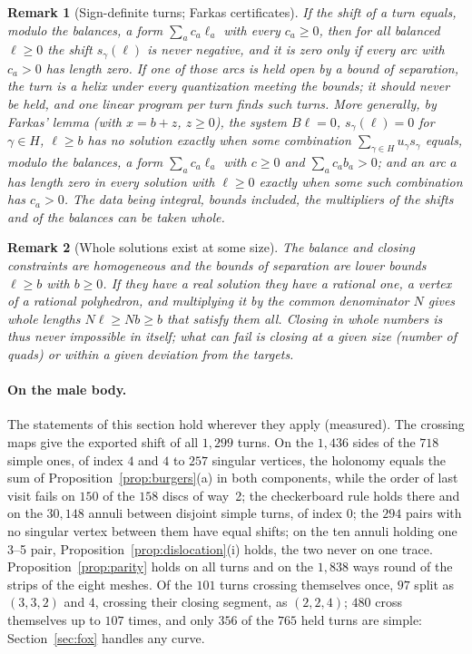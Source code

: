 \documentclass[11pt,a4paper]{article}
\newtheorem{remark}{Remark}
\newcommand{\shift}{s}
\begin{document}
\begin{remark}[Sign-definite turns; Farkas certificates]\label{rem:definite}
If the shift of a turn equals, modulo the balances, a form $\sum_a c_a \ell_a$
with every $c_a \ge 0$, then for all balanced $\ell \ge 0$ the shift
$\shift_\gamma(\ell)$ is never negative, and it is zero only if every arc with
$c_a > 0$ has length zero. If one of those arcs is held open by a bound of
separation, the turn is a helix under every quantization meeting the bounds;
it should never be held, and one linear program per turn finds such turns.
More generally, by Farkas' lemma (with $x = b + z$, $z \ge 0$), the system
$B\ell = 0$, $\shift_\gamma(\ell) = 0$ for $\gamma \in H$, $\ell \ge b$ has no
solution exactly when some combination $\sum_{\gamma \in H} u_\gamma
\shift_\gamma$ equals, modulo the balances, a form $\sum_a c_a \ell_a$ with $c
\ge 0$ and $\sum_a c_a b_a > 0$; and an arc $a$ has length zero in every
solution with $\ell \ge 0$ exactly when some such combination has $c_a > 0$.
The data being integral, bounds included, the multipliers of the shifts and of
the balances can be taken whole.
\end{remark}

\begin{remark}[Whole solutions exist at some size]\label{rem:exist}
The balance and closing constraints are homogeneous and the bounds of
separation are lower bounds $\ell \ge b$ with $b \ge 0$. If they have a real
solution they have a rational one, a vertex of a rational polyhedron, and
multiplying it by the common denominator $N$ gives whole lengths $N\ell \ge Nb
\ge b$ that satisfy them all. Closing in whole numbers is thus never
impossible in itself; what can fail is closing \emph{at a given size} (number
of quads) or within a given deviation from the targets.
\end{remark}

\paragraph{On the male body.}
The statements of this section hold wherever they apply (measured). The
crossing maps give the exported shift of all $1{,}299$ turns. On the
$1{,}436$ sides of the $718$ simple ones, of index $4$ and $4$ to $257$
singular vertices, the holonomy equals the sum of
Proposition~\ref{prop:burgers}(a) in both components, while the order of
last visit fails on $150$ of the $158$ discs of way~2; the checkerboard rule
holds there and on the $30{,}148$ annuli between disjoint simple turns, of
index $0$; the $294$ pairs with no singular vertex between them have equal
shifts; on the ten annuli holding one 3--5 pair,
Proposition~\ref{prop:dislocation}(i) holds, the two never on one trace.
Proposition~\ref{prop:parity} holds on all turns and on the $1{,}838$ ways
round of the strips of the eight meshes. Of the $101$ turns crossing themselves
once, $97$ split as $(3, 3, 2)$ and $4$, crossing their closing segment, as
$(2, 2, 4)$; $480$ cross themselves up to $107$ times, and only $356$ of the
$765$ held turns are simple: Section~\ref{sec:fox} handles any curve.
\end{document}
